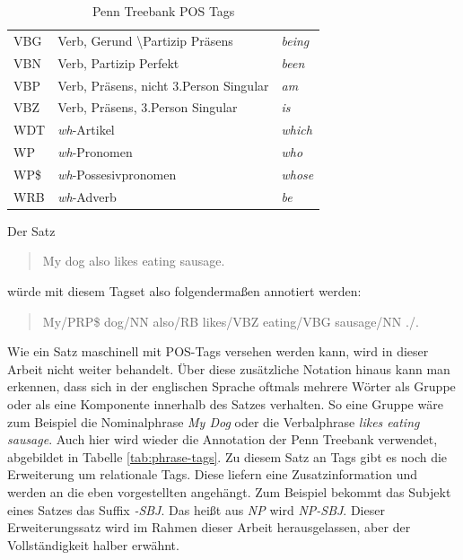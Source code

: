 \begin{table}
\begin{tabular}{ | l l l |}
	VBG & Verb, Gerund \textbackslash Partizip Präsens & \textit{being} \\
	VBN & Verb, Partizip Perfekt & \textit{been} \\
	VBP & Verb, Präsens, nicht 3.Person Singular & \textit{am}  \\
	VBZ & Verb, Präsens, 3.Person Singular & \textit{is} \\
	WDT & \textit{wh}-Artikel & \textit{which} \\
	WP & \textit{wh}-Pronomen & \textit{who} \\
	WP\$ & \textit{wh}-Possesivpronomen & \textit{whose} \\
	WRB & \textit{wh}-Adverb & \textit{be} \\
	\hline
\end{tabular}
\caption{Penn Treebank POS Tags} %
\label{tab:pos-tags}
\end{table}
Der Satz
\begin{quote}
My dog also likes eating sausage.
\end{quote}
würde mit diesem Tagset also folgendermaßen annotiert werden:
\begin{quote}
My/PRP\$ dog/NN also/RB likes/VBZ eating/VBG sausage/NN ./.
\end{quote}
Wie ein Satz maschinell mit POS-Tags versehen werden kann, wird in dieser Arbeit nicht weiter behandelt. 
Über diese zusätzliche Notation hinaus kann man erkennen, dass sich in der englischen Sprache oftmals mehrere Wörter als Gruppe oder als eine Komponente innerhalb des Satzes verhalten. So eine Gruppe wäre zum Beispiel die Nominalphrase \textit{My Dog} oder die Verbalphrase \textit{likes eating sausage}. Auch hier wird wieder die Annotation der Penn Treebank verwendet, abgebildet in Tabelle \ref{tab:phrase-tags}. Zu diesem Satz an Tags gibt es noch die Erweiterung um relationale Tags. Diese liefern eine Zusatzinformation und werden an die eben vorgestellten angehängt. Zum Beispiel bekommt das Subjekt eines Satzes das Suffix \textit{-SBJ}. Das heißt aus \textit{NP} wird \textit{NP-SBJ}. Dieser Erweiterungssatz wird im Rahmen dieser Arbeit herausgelassen, aber der Vollständigkeit halber erwähnt.
